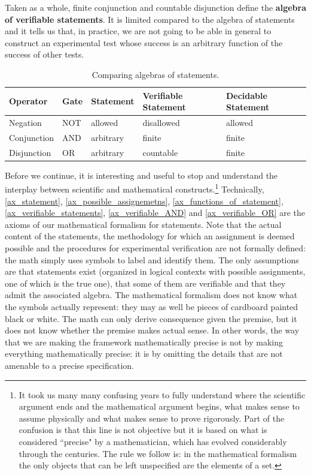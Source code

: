 \documentclass[11pt,letterpaper,fleqn]{memoir} %
\begin{document}
Taken as a whole, finite conjunction and countable disjunction define the \textbf{algebra of verifiable statements}. It is limited compared to the algebra of statements and it tells us that, in practice, we are not going to be able in general to construct an experimental test whose success is an arbitrary function of the success of other tests.

\begin{table}[h]
	\centering
\begin{tabular}{p{} p{} p{} p{} p{}}
	Operator & Gate & Statement & Verifiable Statement & Decidable Statement  \\ 
	\hline 
	Negation & NOT & allowed & disallowed & allowed \\ 
	Conjunction & AND & arbitrary  & finite & finite \\ 
	Disjunction & OR & arbitrary  & countable & finite \\ 
\end{tabular}
	\caption{Comparing algebras of statements.}
\end{table}

Before we continue, it is interesting and useful to stop and understand the interplay between scientific and mathematical constructs.\footnote{It took us many many confusing years to fully understand where the scientific argument ends and the mathematical argument begins, what makes sense to assume physically and what makes sense to prove rigorously. Part of the confusion is that this line is not objective but it is based on what is considered ``precise" by a mathematician, which has evolved considerably through the centuries. The rule we follow is: in the mathematical formalism the only objects that can be left unspecified are the elements of a set.} Technically, \ref{ax_statement}, \ref{ax_possible_assignemetns}, \ref{ax_functions_of_statement}, \ref{ax_verifiable_statements}, \ref{ax_verifiable_AND} and \ref{ax_verifiable_OR} are the axioms of our mathematical formalism for statements. Note that the actual content of the statements, the methodology for which an assignment is deemed possible and the procedures for experimental verification are not formally defined: the math simply uses symbols to label and identify them. The only assumptions are that statements exist (organized in logical contexts with possible assignments, one of which is the true one), that some of them are verifiable and that they admit the associated algebra. The mathematical formalism does not know what the symbols actually represent: they may as well be pieces of cardboard painted black or white. The math can only derive consequence given the premise, but it does not know whether the premise makes actual sense. In other words, the way that we are making the framework mathematically precise is not by making everything mathematically precise: it is by omitting the details that are not amenable to a precise specification.
\end{document}
